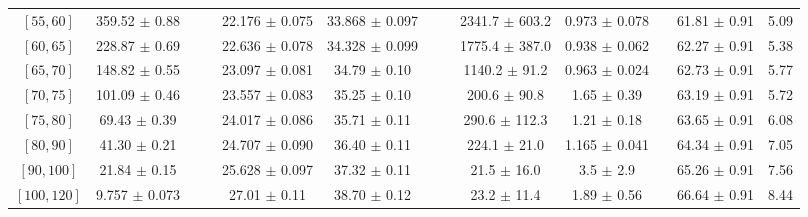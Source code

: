 \begin{tabular}{c||c|c|c|c|c|c|c|c|c|c|c||c}
$[55, 60]$ & 359.52 $\pm$ 0.88 &  &  & 22.176 $\pm$ 0.075 & 33.868 $\pm$ 0.097 &  &  & 2341.7 $\pm$ 603.2 & 0.973 $\pm$ 0.078 &  & 61.81 $\pm$ 0.91 & 5.09\\
$[60, 65]$ & 228.87 $\pm$ 0.69 &  &  & 22.636 $\pm$ 0.078 & 34.328 $\pm$ 0.099 &  &  & 1775.4 $\pm$ 387.0 & 0.938 $\pm$ 0.062 &  & 62.27 $\pm$ 0.91 & 5.38\\
$[65, 70]$ & 148.82 $\pm$ 0.55 &  &  & 23.097 $\pm$ 0.081 & 34.79 $\pm$ 0.10 &  &  & 1140.2 $\pm$ 91.2 & 0.963 $\pm$ 0.024 &  & 62.73 $\pm$ 0.91 & 5.77\\
$[70, 75]$ & 101.09 $\pm$ 0.46 &  &  & 23.557 $\pm$ 0.083 & 35.25 $\pm$ 0.10 &  &  & 200.6 $\pm$ 90.8 & 1.65 $\pm$ 0.39 &  & 63.19 $\pm$ 0.91 & 5.72\\
$[75, 80]$ & 69.43 $\pm$ 0.39 &  &  & 24.017 $\pm$ 0.086 & 35.71 $\pm$ 0.11 &  &  & 290.6 $\pm$ 112.3 & 1.21 $\pm$ 0.18 &  & 63.65 $\pm$ 0.91 & 6.08\\
$[80, 90]$ & 41.30 $\pm$ 0.21 &  &  & 24.707 $\pm$ 0.090 & 36.40 $\pm$ 0.11 &  &  & 224.1 $\pm$ 21.0 & 1.165 $\pm$ 0.041 &  & 64.34 $\pm$ 0.91 & 7.05\\
$[90, 100]$ & 21.84 $\pm$ 0.15 &  &  & 25.628 $\pm$ 0.097 & 37.32 $\pm$ 0.11 &  &  & 21.5 $\pm$ 16.0 & 3.5 $\pm$ 2.9 &  & 65.26 $\pm$ 0.91 & 7.56\\
$[100, 120]$ & 9.757 $\pm$ 0.073 &  &  & 27.01 $\pm$ 0.11 & 38.70 $\pm$ 0.12 &  &  & 23.2 $\pm$ 11.4 & 1.89 $\pm$ 0.56 &  & 66.64 $\pm$ 0.91 & 8.44\\
\end{tabular}
